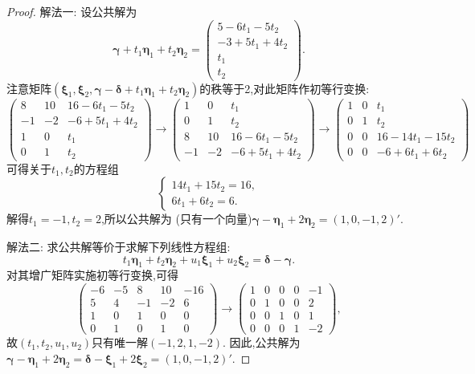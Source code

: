 \documentclass[../../main.tex]{subfiles}%
\begin{document}
\begin{proof}

{\color{blue}解法一:} 设公共解为
\[
\boldsymbol{\gamma}+t_1\boldsymbol{\eta}_1 + t_2\boldsymbol{\eta}_2=\begin{pmatrix}
5 - 6t_1 - 5t_2\\
-3 + 5t_1 + 4t_2\\
t_1\\
t_2
\end{pmatrix}.
\]
注意矩阵\((\boldsymbol{\xi}_1,\boldsymbol{\xi}_2,\boldsymbol{\gamma}-\boldsymbol{\delta}+t_1\boldsymbol{\eta}_1 + t_2\boldsymbol{\eta}_2)\)的秩等于2,对此矩阵作初等行变换:
\[
\begin{pmatrix}
8&10&16 - 6t_1 - 5t_2\\
-1&-2&-6 + 5t_1 + 4t_2\\
1&0&t_1\\
0&1&t_2
\end{pmatrix}\to\begin{pmatrix}
1&0&t_1\\
0&1&t_2\\
8&10&16 - 6t_1 - 5t_2\\
-1&-2&-6 + 5t_1 + 4t_2
\end{pmatrix}\to
\begin{pmatrix}
1&0&t_1\\
0&1&t_2\\
0&0&16 - 14t_1 - 15t_2\\
0&0&-6 + 6t_1 + 6t_2
\end{pmatrix}
\]
可得关于\(t_1,t_2\)的方程组
\[
\begin{cases}
14t_1 + 15t_2 = 16,\\
6t_1 + 6t_2 = 6.
\end{cases}
\]
解得\(t_1=-1,t_2 = 2\),所以公共解为 (只有一个向量)\(\boldsymbol{\gamma}-\boldsymbol{\eta}_1 + 2\boldsymbol{\eta}_2=(1,0,-1,2)'\).

{\color{blue}解法二:} 求公共解等价于求解下列线性方程组:
\[
t_1\boldsymbol{\eta}_1 + t_2\boldsymbol{\eta}_2 + u_1\boldsymbol{\xi}_1 + u_2\boldsymbol{\xi}_2=\boldsymbol{\delta}-\boldsymbol{\gamma}.
\]
对其增广矩阵实施初等行变换,可得
\[
\begin{pmatrix}
-6&-5&8&10&-16\\
5&4&-1&-2&6\\
1&0&1&0&0\\
0&1&0&1&0
\end{pmatrix}\to\begin{pmatrix}
1&0&0&0&-1\\
0&1&0&0&2\\
0&0&1&0&1\\
0&0&0&1&-2
\end{pmatrix},
\]
故\((t_1,t_2,u_1,u_2)\)只有唯一解\((-1,2,1,-2)\). 因此,公共解为\(\boldsymbol{\gamma}-\boldsymbol{\eta}_1 + 2\boldsymbol{\eta}_2=\boldsymbol{\delta}-\boldsymbol{\xi}_1 + 2\boldsymbol{\xi}_2=(1,0,-1,2)'\).

\end{proof}
\end{document}
